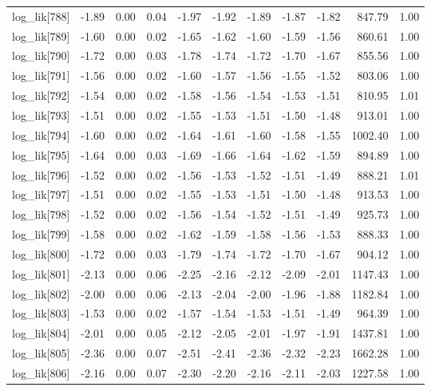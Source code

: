 \begin{table}[ht]
\begin{tabular}{rrrrrrrrrrr}
  log\_lik[788] & -1.89 & 0.00 & 0.04 & -1.97 & -1.92 & -1.89 & -1.87 & -1.82 & 847.79 & 1.00 \\ 
  log\_lik[789] & -1.60 & 0.00 & 0.02 & -1.65 & -1.62 & -1.60 & -1.59 & -1.56 & 860.61 & 1.00 \\ 
  log\_lik[790] & -1.72 & 0.00 & 0.03 & -1.78 & -1.74 & -1.72 & -1.70 & -1.67 & 855.56 & 1.00 \\ 
  log\_lik[791] & -1.56 & 0.00 & 0.02 & -1.60 & -1.57 & -1.56 & -1.55 & -1.52 & 803.06 & 1.00 \\ 
  log\_lik[792] & -1.54 & 0.00 & 0.02 & -1.58 & -1.56 & -1.54 & -1.53 & -1.51 & 810.95 & 1.01 \\ 
  log\_lik[793] & -1.51 & 0.00 & 0.02 & -1.55 & -1.53 & -1.51 & -1.50 & -1.48 & 913.01 & 1.00 \\ 
  log\_lik[794] & -1.60 & 0.00 & 0.02 & -1.64 & -1.61 & -1.60 & -1.58 & -1.55 & 1002.40 & 1.00 \\ 
  log\_lik[795] & -1.64 & 0.00 & 0.03 & -1.69 & -1.66 & -1.64 & -1.62 & -1.59 & 894.89 & 1.00 \\ 
  log\_lik[796] & -1.52 & 0.00 & 0.02 & -1.56 & -1.53 & -1.52 & -1.51 & -1.49 & 888.21 & 1.01 \\ 
  log\_lik[797] & -1.51 & 0.00 & 0.02 & -1.55 & -1.53 & -1.51 & -1.50 & -1.48 & 913.53 & 1.00 \\ 
  log\_lik[798] & -1.52 & 0.00 & 0.02 & -1.56 & -1.54 & -1.52 & -1.51 & -1.49 & 925.73 & 1.00 \\ 
  log\_lik[799] & -1.58 & 0.00 & 0.02 & -1.62 & -1.59 & -1.58 & -1.56 & -1.53 & 888.33 & 1.00 \\ 
  log\_lik[800] & -1.72 & 0.00 & 0.03 & -1.79 & -1.74 & -1.72 & -1.70 & -1.67 & 904.12 & 1.00 \\ 
  log\_lik[801] & -2.13 & 0.00 & 0.06 & -2.25 & -2.16 & -2.12 & -2.09 & -2.01 & 1147.43 & 1.00 \\ 
  log\_lik[802] & -2.00 & 0.00 & 0.06 & -2.13 & -2.04 & -2.00 & -1.96 & -1.88 & 1182.84 & 1.00 \\ 
  log\_lik[803] & -1.53 & 0.00 & 0.02 & -1.57 & -1.54 & -1.53 & -1.51 & -1.49 & 964.39 & 1.00 \\ 
  log\_lik[804] & -2.01 & 0.00 & 0.05 & -2.12 & -2.05 & -2.01 & -1.97 & -1.91 & 1437.81 & 1.00 \\ 
  log\_lik[805] & -2.36 & 0.00 & 0.07 & -2.51 & -2.41 & -2.36 & -2.32 & -2.23 & 1662.28 & 1.00 \\ 
  log\_lik[806] & -2.16 & 0.00 & 0.07 & -2.30 & -2.20 & -2.16 & -2.11 & -2.03 & 1227.58 & 1.00 \\ 

\end{tabular}
\end{table}

